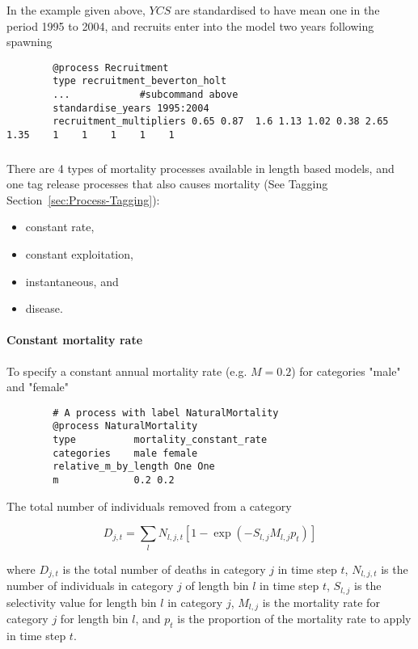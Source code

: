 In the  example given above, $YCS$ are standardised to have mean one in the period 1995 to 2004, and recruits enter into the model two years following spawning

{\small{\begin{verbatim}
		@process Recruitment
		type recruitment_beverton_holt
		...            #subcommand above
		standardise_years 1995:2004
		recruitment_multipliers 0.65 0.87  1.6 1.13 1.02 0.38 2.65 1.35    1    1    1    1    1
		\end{verbatim}}}


\subsubsection{\label{sec:Process-Mortality}}

There are 4 types of mortality processes available in \CNAME length based models, and one tag release processes that also causes mortality (See Tagging Section~\ref{sec:Process-Tagging}):

\begin{itemize}
	\item constant rate,
	\item constant exploitation,
	\item instantaneous, and
	\item disease.
\end{itemize}

\paragraph{Constant mortality rate}\label{sec:Process-MortalityConstantRate} 

To specify a constant annual mortality rate (e.g. $M=0.2$) for categories "male" and "female"
{\small{\begin{verbatim}
		# A process with label NaturalMortality
		@process NaturalMortality
		type          mortality_constant_rate
		categories    male female
		relative_m_by_length One One
		m             0.2 0.2
		\end{verbatim}}}

The total number of individuals removed from a category

\begin{equation}
D_{j,t} = \sum_l N_{l,j,t} [1 - \exp(-S_{l,j} M_{l,j} p_t)]
\end{equation}

where $D_{j,t}$ is the total number of deaths in category $j$ in time step $t$, $N_{l,j,t}$ is the number of individuals in category $j$ of length bin $l$ in time step $t$, $S_{l,j}$ is the selectivity value for length bin $l$ in category $j$, $M_{l,j}$ is the mortality rate for category $j$ for length bin $l$, and $p_t$ is the proportion of the mortality rate to apply in time step $t$.

